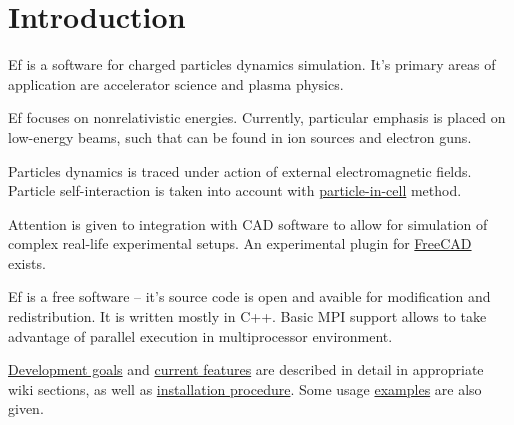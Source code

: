 \section{Introduction}

Ef is a software for charged particles dynamics simulation.  It's
primary areas of application are accelerator science and plasma
physics.

Ef focuses on nonrelativistic energies. Currently, particular
emphasis is placed on low-energy beams, such that can be found in ion
sources and electron guns.

Particles dynamics is traced under action of external electromagnetic
fields.  Particle self-interaction is taken into account with
\href{https://en.wikipedia.org/wiki/Particle-in-cell}{particle-in-cell} 
method.

Attention is given to integration with CAD software to allow for
simulation of complex real-life experimental setups.  An experimental
plugin for \href{http://www.freecadweb.org/}{FreeCAD} exists.

Ef is a free software -- it's source code is open and avaible for
modification and redistribution.  It is written mostly in C++.  Basic
MPI support allows to take advantage of parallel execution in
multiprocessor environment.

\href{https://github.com/epicf/epicf/wiki/1-Rationale-and-Aims}{Development goals}
and 
\href{https://github.com/epicf/epicf/wiki/3-Feature-Matrix-and-Development-Roadmap}{current features}
are described in detail in appropriate wiki sections,
as well as \href{https://github.com/epicf/epicf/wiki/4-Installation}{installation procedure}.
Some usage \href{https://github.com/epicf/epicf/wiki/Examples}{examples}
are also given.

